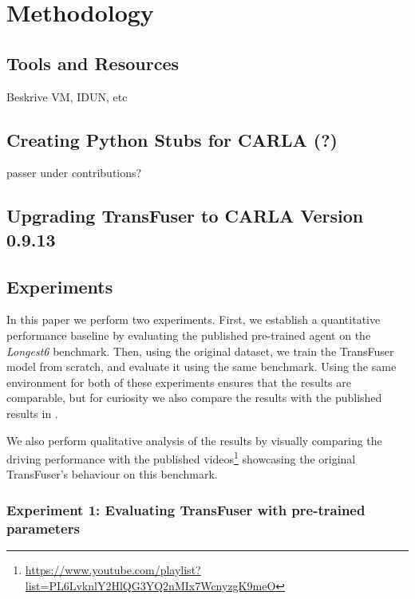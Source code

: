 \chapter{Methodology}
\label{chap:method}



\section{Tools and Resources}
Beskrive VM, IDUN, etc


\section{Creating Python Stubs for CARLA (?)}

passer under contributions?


\section{Upgrading TransFuser to CARLA Version 0.9.13}

\section{Experiments}

In this paper we perform two experiments.
First, we establish a quantitative performance baseline 
by evaluating the published pre-trained agent on the \textit{Longest6} benchmark.
Then, using the original dataset, we train the TransFuser model from scratch,
and evaluate it using the same benchmark.
Using the same environment for both of these experiments ensures that the results are comparable,
but for curiosity we also compare the results with the published results in \cite{transfuser-pami}.

We also perform qualitative analysis of the results by visually comparing the driving performance
with the published videos\footnote{\url{https://www.youtube.com/playlist?list=PL6LvknlY2HlQG3YQ2nMIx7WcnyzgK9meO}}
showcasing the original TransFuser's behaviour on this benchmark.


\subsection{Experiment 1: Evaluating TransFuser with pre-trained parameters}
\label{sec:method:experiment1}

